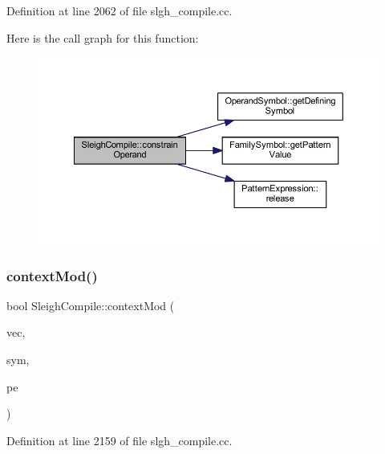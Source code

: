 Definition at line 2062 of file slgh\+\_\+compile.\+cc.

Here is the call graph for this function\+:
\nopagebreak
\begin{figure}[H]
\begin{center}
\leavevmode
\includegraphics[width=350pt]{class_sleigh_compile_af726f70a39e1b7e9a7695f7fcae7523e_cgraph}
\end{center}
\end{figure}
\mbox{\label{class_sleigh_compile_a84c46e7d0a62a9fbdb300e9b2df3f303}} 
\subsubsection{\texorpdfstring{contextMod()}{contextMod()}}
{\footnotesize\ttfamily bool Sleigh\+Compile\+::context\+Mod (\begin{DoxyParamCaption}\item[{vector$<$ \mbox{\hyperlink{class_context_change}{Context\+Change}} $\ast$ $>$ $\ast$}]{vec,  }\item[{\mbox{\hyperlink{class_context_symbol}{Context\+Symbol}} $\ast$}]{sym,  }\item[{\mbox{\hyperlink{class_pattern_expression}{Pattern\+Expression}} $\ast$}]{pe }\end{DoxyParamCaption})}



Definition at line 2159 of file slgh\+\_\+compile.\+cc.

